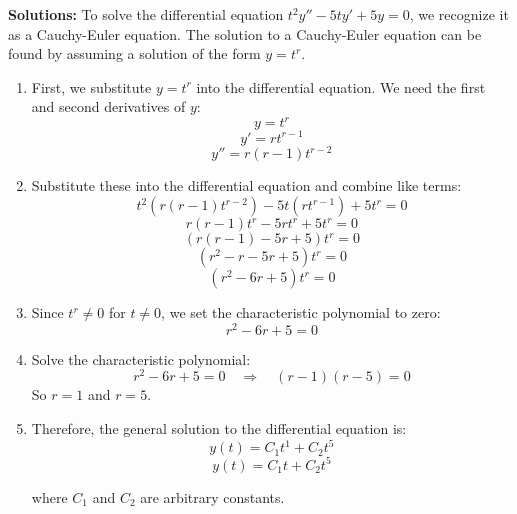 \ifnum {} {\color{DarkBlue} 
\textbf{Solutions:}
To solve the differential equation \( t^2 y'' - 5t y' + 5y = 0 \), we recognize it as a Cauchy-Euler equation. The solution to a Cauchy-Euler equation can be found by assuming a solution of the form \( y = t^r \). 

\begin{enumerate}
    \item First, we substitute \( y = t^r \) into the differential equation. We need the first and second derivatives of \( y \):
   \[ y = t^r \]
   \[ y' = r t^{r-1} \]
   \[ y'' = r (r-1) t^{r-2} \]

    \item Substitute these into the differential equation and combine like terms:
   \[ t^2 (r (r-1) t^{r-2}) - 5t (r t^{r-1}) + 5 t^r = 0 \]
   \[ r (r-1) t^r - 5r t^r + 5 t^r = 0 \]
   \[ (r (r-1) - 5r + 5) t^r = 0 \]
   \[ (r^2 - r - 5r + 5) t^r = 0 \]
   \[ (r^2 - 6r + 5) t^r = 0 \]

    \item Since \( t^r \neq 0 \) for \( t \neq 0 \), we set the characteristic polynomial to zero:
   \[ r^2 - 6r + 5 = 0 \]

    \item Solve the characteristic polynomial:
   \[ r^2 - 6r + 5 = 0 \quad \Rightarrow \quad (r - 1)(r - 5) = 0 \]
   So \( r = 1 \) and \( r = 5 \).

    \item Therefore, the general solution to the differential equation is:
   \[ y(t) = C_1 t^1 + C_2 t^5 \]
   \[ y(t) = C_1 t + C_2 t^5 \]

where \( C_1 \) and \( C_2 \) are arbitrary constants.
\end{enumerate}


} 
\else 
\newpage
\fi
\fi 
